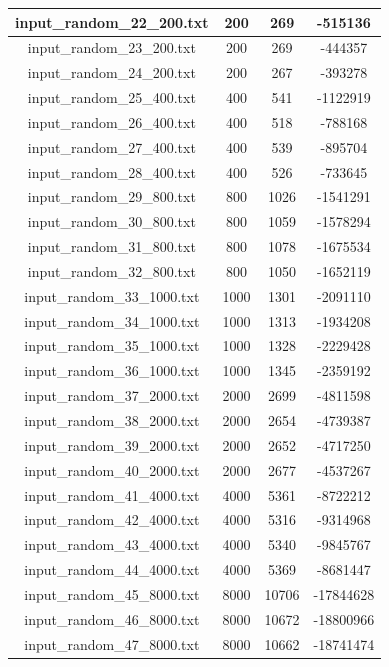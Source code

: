 \begin{longtable}{|c|c|c|c|}
	input\_random\_22\_200.txt & 200 & 269 & -515136 \\ \hline
	input\_random\_23\_200.txt & 200 & 269 & -444357 \\ \hline
	input\_random\_24\_200.txt & 200 & 267 & -393278 \\ \hline
	input\_random\_25\_400.txt & 400 & 541 & -1122919 \\ \hline
	input\_random\_26\_400.txt & 400 & 518 & -788168 \\ \hline
	input\_random\_27\_400.txt & 400 & 539 & -895704 \\ \hline
	input\_random\_28\_400.txt & 400 & 526 & -733645 \\ \hline
	input\_random\_29\_800.txt & 800 & 1026 & -1541291 \\ \hline
	input\_random\_30\_800.txt & 800 & 1059 & -1578294 \\ \hline
	input\_random\_31\_800.txt & 800 & 1078 & -1675534 \\ \hline
	input\_random\_32\_800.txt & 800 & 1050 & -1652119 \\ \hline
	input\_random\_33\_1000.txt & 1000 & 1301 & -2091110 \\ \hline
	input\_random\_34\_1000.txt & 1000 & 1313 & -1934208 \\ \hline
	input\_random\_35\_1000.txt & 1000 & 1328 & -2229428 \\ \hline
	input\_random\_36\_1000.txt & 1000 & 1345 & -2359192 \\ \hline
	input\_random\_37\_2000.txt & 2000 & 2699 & -4811598 \\ \hline
	input\_random\_38\_2000.txt & 2000 & 2654 & -4739387 \\ \hline
	input\_random\_39\_2000.txt & 2000 & 2652 & -4717250 \\ \hline
	input\_random\_40\_2000.txt & 2000 & 2677 & -4537267 \\ \hline
	input\_random\_41\_4000.txt & 4000 & 5361 & -8722212 \\ \hline
	input\_random\_42\_4000.txt & 4000 & 5316 & -9314968 \\ \hline
	input\_random\_43\_4000.txt & 4000 & 5340 & -9845767 \\ \hline
	input\_random\_44\_4000.txt & 4000 & 5369 & -8681447 \\ \hline
	input\_random\_45\_8000.txt & 8000 & 10706 & -17844628 \\ \hline
	input\_random\_46\_8000.txt & 8000 & 10672 & -18800966 \\ \hline
	input\_random\_47\_8000.txt & 8000 & 10662 & -18741474 \\ \hline

\end{longtable}
